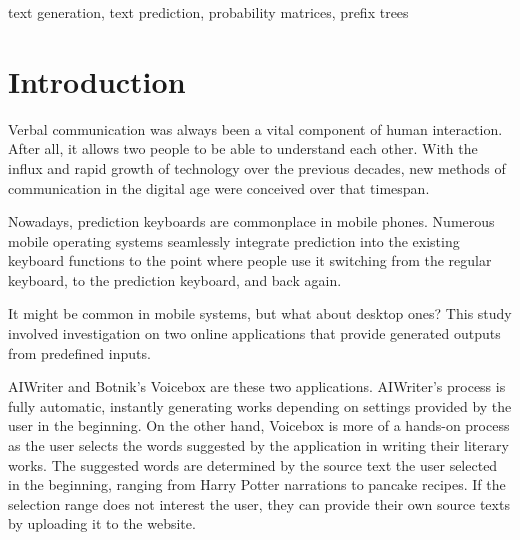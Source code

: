 \documentclass[journal]{./IEEE/IEEEtran}
\title{\SPTITLE}
\author{\ADVISEE~and~\ADVISER
\REMARK
}
\begin{document}
\maketitle

\begin{abstract}
With the advent of the digital age, communication has evolved to a point where technology is seamlessly integrated into day-to-day conversation. Primarily found in mobile phones, text prediction systems involves streamlining the communication by providing users with suggested words that they can select, based on the previous word they provided. This study aims to implement a similar technology, embedded in an application developed for the Chrome browser to provide the power of text prediction in desktop environments, in an application most users use in their day-to-day lives. The predictor was developed using various representations of the text input, where probability matrices and prefix trees provide the most importance.
\end{abstract}

\begin{keywords}
text generation, text prediction, probability matrices, prefix trees
\end{keywords}

\section{Introduction}
Verbal communication was always been a vital component of human interaction. After all, it allows two people to be able to understand each other. With the influx and rapid growth of technology over the previous decades, new methods of communication in the digital age were conceived over that timespan.

Nowadays, prediction keyboards are commonplace in mobile phones. Numerous mobile operating systems seamlessly integrate prediction into the existing keyboard functions to the point where people use it switching from the regular keyboard, to the prediction keyboard, and back again.

It might be common in mobile systems, but what about desktop ones? This study involved investigation on two online applications that provide generated outputs from predefined inputs.

AIWriter\cite{AIWriter} and Botnik's Voicebox\cite{Voicebox} are these two applications. AIWriter's process is fully automatic, instantly generating works depending on settings provided by the user in the beginning. On the other hand, Voicebox is more of a hands-on process as the user selects the words suggested by the application in writing their literary works. The suggested words are determined by the source text the user selected in the beginning, ranging from Harry Potter narrations to pancake recipes. If the selection range does not interest the user, they can provide their own source texts by uploading it to the website.
\end{document}
